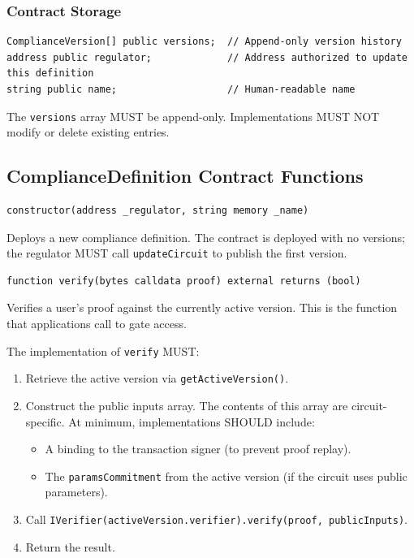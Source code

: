 \documentclass[9pt]{extreport}
\begin{document}
\subsubsection{Contract Storage}
\label{sec:storage}

\begin{singlespace}
\begin{lstlisting}[language=Solidity]
ComplianceVersion[] public versions;  // Append-only version history
address public regulator;             // Address authorized to update this definition
string public name;                   // Human-readable name
\end{lstlisting}
\end{singlespace}

The \texttt{versions} array MUST be append-only. Implementations MUST NOT modify or delete existing entries.

\subsection{ComplianceDefinition Contract Functions}
\label{sec:functions}


\begin{lstlisting}[language=Solidity]
constructor(address _regulator, string memory _name)
\end{lstlisting}

Deploys a new compliance definition. The contract is deployed with no versions; the regulator MUST call \texttt{updateCircuit} to publish the first version.

\vspace{2em}
\begin{lstlisting}[language=Solidity]
function verify(bytes calldata proof) external returns (bool)
\end{lstlisting}

Verifies a user's proof against the currently active version. This is the function that applications call to gate access.

The implementation of \texttt{verify} MUST:
\begin{enumerate}
    \item Retrieve the active version via \texttt{getActiveVersion()}.
    \item Construct the public inputs array. The contents of this array are circuit-specific. At minimum, implementations SHOULD include:
    \begin{itemize}
        \item A binding to the transaction signer (to prevent proof replay).
        \item The \texttt{paramsCommitment} from the active version (if the circuit uses public parameters).
    \end{itemize}
    \item Call \texttt{IVerifier(activeVersion.verifier).verify(proof, publicInputs)}.
    \item Return the result.
\end{enumerate}
\end{document}
